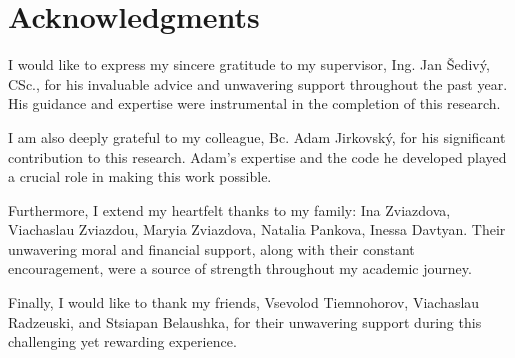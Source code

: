 
\section*{Acknowledgments}

I would like to express my sincere gratitude to my supervisor, Ing. Jan Šedivý, CSc., for his invaluable advice and unwavering support throughout the past year.
His guidance and expertise were instrumental in the completion of this research.

I am also deeply grateful to my colleague, Bc. Adam Jirkovský, for his significant contribution to this research.
Adam's expertise and the code he developed played a crucial role in making this work possible.

Furthermore, I extend my heartfelt thanks to my family: Ina Zviazdova, Viachaslau Zviazdou, Maryia Zviazdova, Natalia Pankova, Inessa Davtyan.
Their unwavering moral and financial support, along with their constant encouragement, were a source of strength throughout my academic journey.

Finally, I would like to thank my friends, Vsevolod Tiemnohorov, Viachaslau Radzeuski, and Stsiapan Belaushka, for their unwavering support during this challenging yet rewarding experience.

\vspace{2.5cm}
